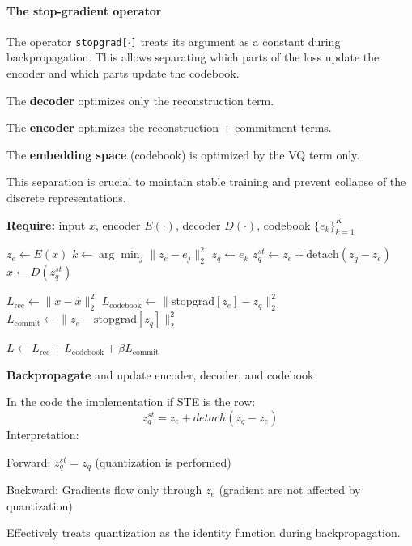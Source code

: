 \paragraph{The stop-gradient operator}
The operator \texttt{stopgrad[$\cdot$]} treats its argument as a constant during backpropagation.  
This allows separating which parts of the loss update the encoder and which parts update the codebook.

\begin{compactitemize}
    \item The \textbf{decoder} optimizes only the reconstruction term.
    \item The \textbf{encoder} optimizes the reconstruction + commitment terms.
    \item The \textbf{embedding space} (codebook) is optimized by the VQ term only.
\end{compactitemize}

This separation is crucial to maintain stable training and prevent collapse of the discrete representations.

\begin{algorithm}[H]
    \caption{VQ-VAE Training Step}
    \textbf{Require:} input $x$, encoder $E(\cdot)$, decoder $D(\cdot)$, codebook $\{e_k\}_{k=1}^K$
    
    $z_e \leftarrow E(x)$ 
    $k \leftarrow \arg\min_j \| z_e - e_j \|_2^2$ 
    $z_q \leftarrow e_k$ 
    $z_q^{st} \leftarrow z_e + \text{detach}(z_q - z_e)$ 
    $\hat{x} \leftarrow D(z_q^{st})$ 
    
    $L_{\text{rec}} \leftarrow \|x - \hat{x}\|_2^2$ 
    $L_{\text{codebook}} \leftarrow \|\text{stopgrad}[z_e] - z_q\|_2^2$ 
    $L_{\text{commit}} \leftarrow \|z_e - \text{stopgrad}[z_q]\|_2^2$ 
    
    $L \leftarrow L_{\text{rec}} + L_{\text{codebook}} + \beta L_{\text{commit}}$ 
    
    \textbf{Backpropagate} and update encoder, decoder, and codebook\;
\end{algorithm}

In the code the implementation if STE is the row:
\[
    z_q^{st}=z_e + detach(z_q - z_e)
\]
Interpretation:
\begin{compactitemize}
    \item Forward: $z_q^{st}=z_q$ (quantization is performed)
    \item Backward: Gradients flow only through $z_e$ (gradient are not affected by quantization)
    \item Effectively treats quantization as the identity function during backpropagation.
\end{compactitemize}

